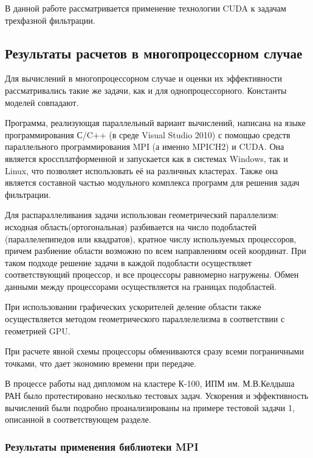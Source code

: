 В данной работе рассматривается применение технологии CUDA к задачам 
трехфазной фильтрации.

\subsection{Результаты расчетов в многопроцессорном случае}

Для вычислений в многопроцессорном случае и оценки их эффективности
рассматривались такие же задачи, как и для однопроцессорного. Константы моделей
совпадают.

Программа, реализующая параллельный вариант вычислений, написана на языке
программирования С/C++ (в среде Visual Studio 2010) с помощью средств
параллельного программирования MPI (а именно MPICH2) и CUDA. Она является
кроссплатформенной и запускается как в системах Windows, так и Linux, что
позволяет использовать её на различных кластерах. Также она является составной
частью модульного комплекса программ для решения задач фильтрации. 

Для распараллеливания задачи использован геометрический параллелизм: исходная 
область(ортогональная) разбивается на число подобластей (параллелепипедов или квадратов), 
кратное числу
используемых процессоров, причем разбиение области возможно по всем направлениям осей
координат.
При таком подходе решение задачи в каждой подобласти осуществляет
соответствующий процессор, и все процессоры равномерно нагружены. Обмен данными
между процессорами осуществляется  на границах подобластей.

При использовании графических ускорителей деление области также осуществляется
методом геометрического параллелелизма в соответствии с геометрией GPU. 
	
При расчете явной схемы процессоры обмениваются сразу всеми пограничными
точками, что дает экономию времени при передаче. 

В процессе работы над дипломом на кластере К-100, ИПМ им. М.В.Келдыша РАН
было протестировано несколько тестовых задач. Ускорения и эффективность вычислений
были подробно проанализированы на примере тестовой задачи 1, описанной в соответствующем
разделе. 

\subsubsection{Результаты применения библиотеки MPI}

